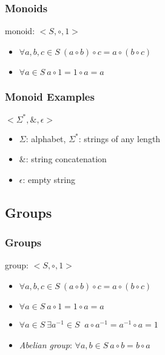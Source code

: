 \documentclass[dvipsnames]{beamer}
\begin{document}
\begin{frame}
  \frametitle{Monoids}

  \begin{definition}
    \alert{monoid}: $<S,\circ,1>$

    \begin{itemize}
      \item $\forall a,b,c \in S~(a \circ b) \circ c = a \circ (b \circ c)$
      \item $\forall a \in S~a \circ 1 = 1 \circ a = a$
    \end{itemize}
  \end{definition}
\end{frame}

\begin{frame}
  \frametitle{Monoid Examples}

  \begin{example}
    $<\Sigma^*,\&,\epsilon>$

    \begin{itemize}
      \item $\Sigma$: alphabet, $\Sigma^*$: strings of any length
      \item $\&$: string concatenation
      \item $\epsilon$: empty string
    \end{itemize}
  \end{example}
\end{frame}

\subsection{Groups}

\begin{frame}
  \frametitle{Groups}

  \begin{definition}
    \alert{group}: $<S,\circ,1>$

    \begin{itemize}
      \item $\forall a,b,c \in S~(a \circ b) \circ c = a \circ (b \circ c)$
      \item $\forall a \in S~a \circ 1 = 1 \circ a = a$
      \item $\forall a \in S~\exists a^{-1} \in S~$
        $a \circ a^{-1} = a^{-1} \circ a = 1$

      \pause
      \medskip
      \item \emph{Abelian group}: $\forall a,b \in S~a \circ b = b \circ a$
    \end{itemize}
  \end{definition}
\end{frame}
\end{document}
